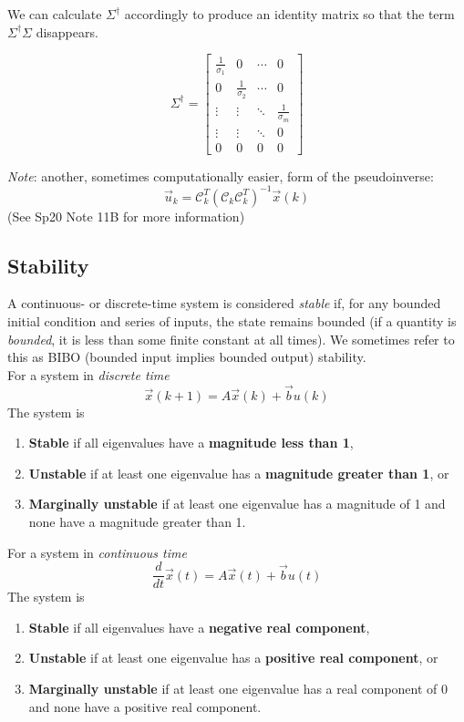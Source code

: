 We can calculate $\Sigma^{\dagger}$ accordingly to produce an identity matrix so that the term $\Sigma^{\dagger}\Sigma$ disappears.

$$\Sigma^{\dagger} = \begin{bmatrix} \frac{1}{\sigma_{1}} & 0 &  \cdots & 0 \\ 0 & \frac{1}{\sigma_{2}} & \cdots & 0 \\ \vdots & \vdots & \ddots & \frac{1}{\sigma_{m}} \\ 
    \vdots & \vdots & \ddots & 0 \\ 0 & 0 & 0 & 0 \end{bmatrix}$$

\textit{Note}: another, sometimes computationally easier, form of the pseudoinverse:
$$\vec{u}_k = \mathcal{C}_k^T(\mathcal{C}_k\mathcal{C}_k^T)^{-1}\vec{x}(k)$$
(See Sp20 Note 11B for more information)

\subsection*{Stability}
A continuous- or discrete-time system is considered \textit{stable} if, for any bounded initial condition and series of inputs, the state remains bounded (if a quantity is \textit{bounded}, it is less than some finite constant at all times). We sometimes refer to this as BIBO (bounded input implies bounded output) stability. \\
\newline
For a system in \textit{discrete time}
$$\vec{x}(k + 1) = A\vec{x}(k) + \vec{b}u(k)$$
The system is
\begin{enumerate}
    \item \textbf{Stable} if all eigenvalues have a \textbf{magnitude less than 1},
    \item \textbf{Unstable} if at least one eigenvalue has a \textbf{magnitude greater than 1}, or
    \item \textbf{Marginally unstable} if at least one eigenvalue has a magnitude of 1 and none have a magnitude greater than 1.
\end{enumerate}

For a system in \textit{continuous time}
$$\frac{d}{dt} \vec{x}(t) = A\vec{x}(t) + \vec{b}u(t)$$
The system is
\begin{enumerate}
    \item \textbf{Stable} if all eigenvalues have a \textbf{negative real component},
    \item \textbf{Unstable} if at least one eigenvalue has a \textbf{positive real component}, or
    \item \textbf{Marginally unstable} if at least one eigenvalue has a real component of 0 and none have a positive real component.
\end{enumerate}


